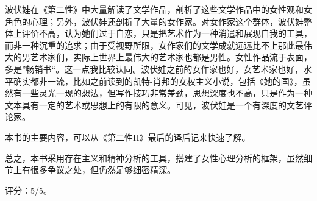 波伏娃在《第二性》中大量解读了文学作品，剖析了这些文学作品中的女性观和女角色的心理；另外，波伏娃还剖析了大量的女作家。对女作家这个群体，波伏娃整体上评价不高，认为她们过于自恋，只是把艺术作为一种消遣和展现自我的工具，而非一种沉重的追求；由于受视野所限，女作家们的文学成就远远比不上那此最伟大的男艺术家们，实际上世界上最伟大的艺术家也都是男性。女性作品流于表面，多是”畅销书“。这一点我比较认同。波伏娃之前的女作家也好，女艺术家也好，水平确实都非一流，比如之前读到的凯特-肖邦的女权主义小说，包括《她的国》，虽然有一些灵光一现的想法，但写作技巧非常差劲，思想深度也不高，只是作为一种文本具有一定的艺术或思想上的有限的意义。可见，波伏娃是一个有深度的文艺评论家。

本书的主要内容，可以从《第二性II》最后的译后记来快速了解。

总之，本书采用存在主义和精神分析的工具，搭建了女性心理分析的框架，虽然细节上有很多争议之处，但仍然足够细密精深。

评分：5/5。